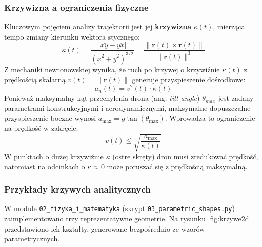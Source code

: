 \subsubsection{Krzywizna a ograniczenia fizyczne}
Kluczowym pojęciem analizy trajektorii jest jej \textbf{krzywizna} $\kappa(t)$, mierząca tempo zmiany kierunku wektora stycznego:
\begin{equation}
    \kappa(t) = \frac{|\dot{x}\ddot{y} - \dot{y}\ddot{x}|}{(\dot{x}^2 + \dot{y}^2)^{3/2}} = \frac{\|\mathbf{\dot{r}}(t) \times \mathbf{\ddot{r}}(t)\|}{\|\mathbf{\dot{r}}(t)\|^3}
\end{equation}
Z mechaniki newtonowskiej wynika, że ruch po krzywej o krzywiźnie $\kappa(t)$ z prędkością skalarną $v(t) = \|\mathbf{\dot{r}}(t)\|$ generuje przyspieszenie dośrodkowe:
\begin{equation}
    a_n(t) = v^2(t) \cdot \kappa(t)
\end{equation}
Ponieważ maksymalny kąt przechylenia drona (ang. \textit{tilt angle}) $\theta_{max}$ jest zadany parametrami konstrukcyjnymi i aerodynamicznymi, maksymalne dopuszczalne przyspieszenie boczne wynosi $a_{\max} = g \tan(\theta_{\max})$. Wprowadza to ograniczenie na prędkość w zakręcie:
\begin{equation}
    v(t) \le \sqrt{\frac{a_{\max}}{\kappa(t)}}
\end{equation}
W punktach o dużej krzywiźnie $\kappa$ (ostre skręty) dron musi zredukować prędkość, natomiast na odcinkach o $\kappa \approx 0$ może poruszać się z prędkością maksymalną.

\subsubsection{Przykłady krzywych analitycznych}

W module \texttt{02\_fizyka\_i\_matematyka} (skrypt \texttt{03\_parametric\_shapes.py}) zaimplementowano trzy reprezentatywne geometrie. Na rysunku \ref{fig:krzywe2d} przedstawiono ich kształty, generowane bezpośrednio ze wzorów parametrycznych.

